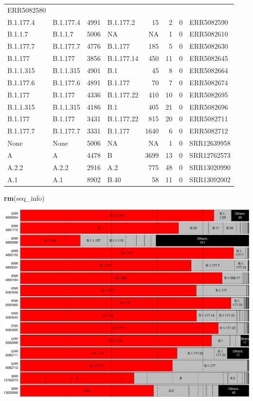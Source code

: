 \documentclass[
]{article}
\newenvironment{Shaded}{\begin{snugshade}}{\end{snugshade}}
\newcommand{\KeywordTok}[1]{\textcolor[rgb]{0.13,0.29,0.53}{\textbf{#1}}}
\newcommand{\NormalTok}[1]{#1}
\begin{document}
\begin{longtable}[]{@{}llrlrrrl@{}}
ERR5082580\tabularnewline
B.1.177.4 & B.1.177.4 & 4991 & B.1.177.2 & 15 & 2 & 0 &
ERR5082590\tabularnewline
B.1.1.7 & B.1.1.7 & 5006 & NA & NA & 1 & 0 & ERR5082610\tabularnewline
B.1.177.7 & B.1.177.7 & 4776 & B.1.177 & 185 & 5 & 0 &
ERR5082630\tabularnewline
B.1.177 & B.1.177 & 3856 & B.1.177.14 & 450 & 11 & 0 &
ERR5082645\tabularnewline
B.1.1.315 & B.1.1.315 & 4901 & B.1 & 45 & 8 & 0 &
ERR5082664\tabularnewline
B.1.177.6 & B.1.177.6 & 4891 & B.1.177 & 70 & 7 & 0 &
ERR5082674\tabularnewline
B.1.177 & B.1.177 & 4336 & B.1.177.22 & 410 & 10 & 0 &
ERR5082695\tabularnewline
B.1.1.315 & B.1.1.315 & 4186 & B.1 & 405 & 21 & 0 &
ERR5082696\tabularnewline
B.1.177 & B.1.177 & 3431 & B.1.177.22 & 815 & 20 & 0 &
ERR5082711\tabularnewline
B.1.177.7 & B.1.177.7 & 3331 & B.1.177 & 1640 & 6 & 0 &
ERR5082712\tabularnewline
None & None & 5006 & NA & NA & 1 & 0 & SRR12639958\tabularnewline
A & A & 4478 & B & 3699 & 13 & 0 & SRR12762573\tabularnewline
A.2.2 & A.2.2 & 2916 & A.2 & 775 & 48 & 0 & SRR13020990\tabularnewline
A.1 & A.1 & 8902 & B.40 & 58 & 11 & 0 & SRR13092002\tabularnewline
\bottomrule
\end{longtable}

\begin{Shaded}
\begin{Highlighting}[]
\KeywordTok{rm}\NormalTok{(seq\_info)}
\end{Highlighting}
\end{Shaded}

\includegraphics{pangolin_results_report_files/figure-latex/pareto-1.pdf}
\end{document}

